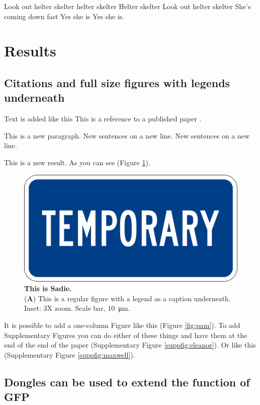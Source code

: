 \documentclass[vruler,JCS]{COB}
\begin{document}
Look out helter skelter helter skelter
Helter skelter
Look out helter skelter
She's coming down fast 
Yes she is 
Yes she is.


\section{Results}\label{s:results}

\subsection{Citations and full size figures with legends underneath}

Text is added like this
This is a reference to a published paper \citep{watson_molecular_1953}.

This is a new paragraph.
New sentences on a new line.
New sentences on a new line.

This is a new result.
As you can see (Figure \ref{fig:sadie}).

\begin{figure}
\centering
\includegraphics[width=0.75\linewidth]{Figures/temp.png}
\caption{\textbf{This is Sadie.}\\
(\textbf{A}) This is a regular figure with a legend as a caption underneath. Inset: 3X zoom. Scale bar, \SI{10}{\micro\meter}.}
\label{fig:sadie}
\end{figure}

It is possible to add a one-column Figure like this (Figure \ref{fig:pam}).
To add Supplementary Figures you can do either of these things and have them at the end of the end of the paper (Supplementary Figure \ref{suppfig:eleanor}).
Or like this (Supplementary Figure \ref{suppfig:maxwell}).

\subsection{Dongles can be used to extend the function of GFP}
\end{document}
